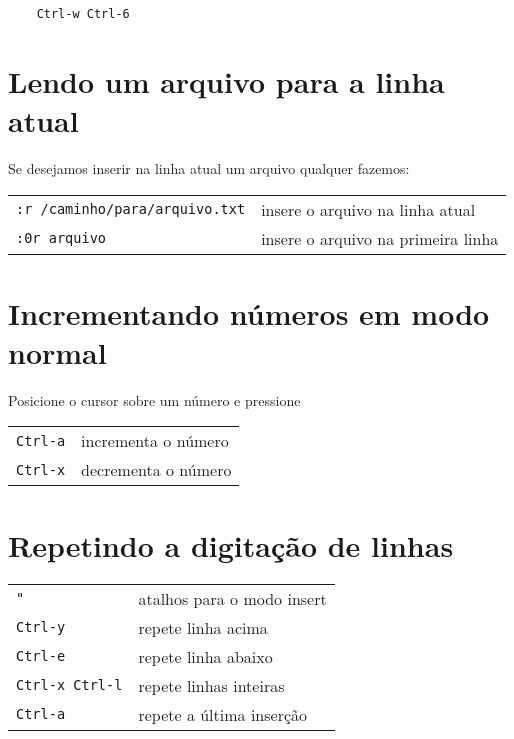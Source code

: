 \begin{verbatim}
    Ctrl-w Ctrl-6
\end{verbatim}

\section{Lendo um arquivo para a linha atual}
\label{sec:Lendo um arquivo para a linha atual}

Se desejamos inserir na linha atual um arquivo qualquer fazemos:

\begin{table}[htb]\begin{center} \begin{tabular}{ll} \hline
	 \verb|:r /caminho/para/arquivo.txt| & insere o arquivo na linha atual\\
	 \verb|:0r arquivo| & insere o arquivo na primeira linha\\
\hline \end{tabular}\end{center}\end{table}

\section{Incrementando números em modo normal}\label{Incrementando números em modo normal}

Posicione o cursor sobre um número e pressione
\begin{table}[htb]\begin{center} \begin{tabular}{ll} \hline
	 \verb|Ctrl-a| & incrementa o número\\
	 \verb|Ctrl-x| & decrementa o número\\
\hline \end{tabular}\end{center}\end{table}

\section{Repetindo a digitação de linhas}
\label{Repetindo a digitação de linhas}

\begin{table}[htb]\begin{center} \begin{tabular}{ll} \hline
     \verb|"| & atalhos para o modo insert\\
     \verb|Ctrl-y| & repete linha acima\\
     \verb|Ctrl-e| & repete linha abaixo\\
     \verb|Ctrl-x Ctrl-l| & repete linhas inteiras\\
     \verb|Ctrl-a| & repete a última inserção\\
\hline \end{tabular}\end{center}\end{table}

